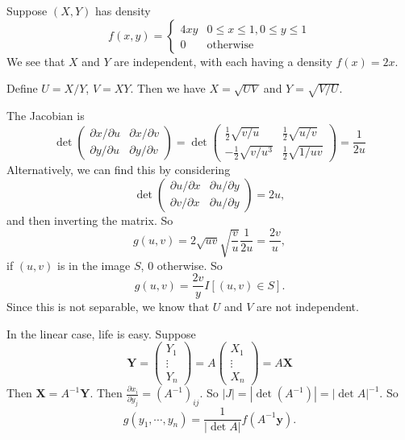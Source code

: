 \documentclass[a4paper]{article}
\begin{document}
\begin{eg}
  Suppose $(X, Y)$ has density
  \[
    f(x, y) =
    \begin{cases}
      4xy & 0 \leq x \leq 1, 0\leq y \leq 1\\
      0 & \text{otherwise}
    \end{cases}
  \]
  We see that $X$ and $Y$ are independent, with each having a density $f(x) = 2x$.

  Define $U = X/Y$, $V = XY$. Then we have $X = \sqrt{UV}$ and $Y = \sqrt{V/U}$.

  The Jacobian is
  \[
    \det
    \begin{pmatrix}
      \partial x/\partial u & \partial x/\partial v\\
      \partial y/\partial u & \partial y/\partial v
    \end{pmatrix}
    =
    \det
    \begin{pmatrix}
      \frac{1}{2}\sqrt{v/u} & \frac{1}{2}\sqrt{u/v}\\
      -\frac{1}{2}\sqrt{v/u^3} & \frac{1}{2}\sqrt{1/uv}
    \end{pmatrix}
    = \frac{1}{2u}
  \]
  Alternatively, we can find this by considering
  \[
    \det
    \begin{pmatrix}
      \partial u/\partial x & \partial u/\partial y\\
      \partial v/\partial x & \partial u/\partial y
    \end{pmatrix} = 2u,
  \]
  and then inverting the matrix. So
  \[
    g(u, v) = 2\sqrt{uv}\sqrt{\frac{v}{u}}\frac{1}{2u} = \frac{2v}{u},
  \]
  if $(u, v)$ is in the image $S$, $0$ otherwise. So
  \[
    g(u, v) = \frac{2v}{y}I[(u, v)\in S].
  \]
  Since this is not separable, we know that $U$ and $V$ are not independent.
\end{eg}

In the linear case, life is easy. Suppose
\[
  \mathbf{Y} = \begin{pmatrix}
    Y_1\\
    \vdots\\
    Y_n
  \end{pmatrix} = A
  \begin{pmatrix}
    X_1\\
    \vdots\\
    X_n
  \end{pmatrix} = A\mathbf{X}
\]
Then $\mathbf{X} = A^{-1}\mathbf{Y}$. Then $\frac{\partial x_i}{\partial y_j} = (A^{-1})_{ij}$. So $|J| = |\det(A^{-1})| = |\det A|^{-1}$. So
\[
  g(y_1, \cdots, y_n) = \frac{1}{|\det A|}f(A^{-1}\mathbf{y}).
\]
\end{document}
